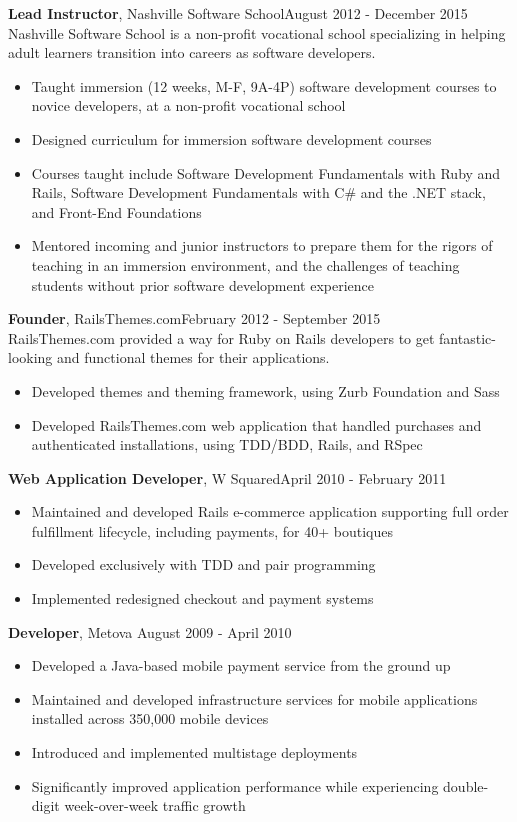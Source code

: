 \documentclass[line, margin, 10pt]{res}
\begin{document}
\begin{resume}
{\bf Lead Instructor}, Nashville Software School\hfill August 2012 - December 2015\\
Nashville Software School is a non-profit vocational school specializing in helping adult learners transition into careers as software developers.
\begin{itemize} \itemsep -2pt  %
  \item Taught immersion (12 weeks, M-F, 9A-4P) software development courses to novice developers, at a non-profit vocational school
  \item Designed curriculum for immersion software development courses
  \item Courses taught include Software Development Fundamentals with Ruby and Rails, Software Development Fundamentals with C\# and the .NET stack, and Front-End Foundations
  \item Mentored incoming and junior instructors to prepare them for the rigors of teaching in an immersion environment, and the challenges of teaching students without prior software development experience
\end{itemize}

{\bf Founder}, RailsThemes.com\hfill February 2012 - September 2015\\
RailsThemes.com provided a way for Ruby on Rails developers to get fantastic-looking and functional themes for their applications.
\begin{itemize} \itemsep -2pt  %
    \item Developed themes and theming framework, using Zurb Foundation and Sass
    \item Developed RailsThemes.com web application that handled purchases and authenticated installations, using TDD/BDD, Rails, and RSpec
\end{itemize}

{\bf Web Application Developer}, W Squared\hfill April 2010 - February 2011
\begin{itemize} \itemsep -2pt
\item Maintained and developed Rails e-commerce application supporting full order fulfillment lifecycle, including payments, for 40+ boutiques
\item Developed exclusively with TDD and pair programming
\item Implemented redesigned checkout and payment systems
\end{itemize}

{\bf Developer}, Metova \hfill August 2009 - April 2010
\begin{itemize} \itemsep -2pt
\item Developed a Java-based mobile payment service from the ground up
\item Maintained and developed infrastructure services for mobile applications installed across 350,000 mobile devices
\item Introduced and implemented multistage deployments
\item Significantly improved application performance while experiencing double-digit week-over-week traffic growth
\end{itemize}


\end{resume}
\end{document}
